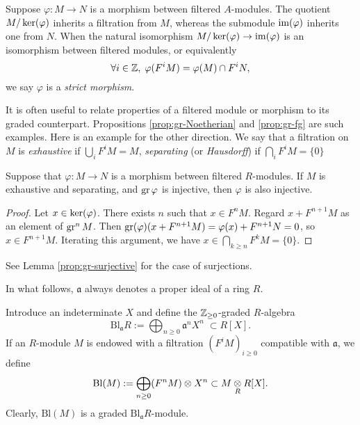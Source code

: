 \begin{remark}
	Suppose $\varphi: M \to N$ is a morphism between filtered $A$-modules. The quotient $M/\operatorname{ker}(\varphi)$ inherits a filtration from $M$, whereas the submodule $\operatorname{im}(\varphi)$ inherits one from $N$. When the natural isomorphism $M/\operatorname{ker}(\varphi) \to \operatorname{im}(\varphi)$ is an isomorphism between filtered modules, or equivalently
	\[ \forall i \in \mathbb{Z}, \; \varphi(F^i M) = \varphi(M) \cap F^i N, \]
	we say $\varphi$ is a \emph{strict morphism}.
\end{remark}

It is often useful to relate properties of a filtered module or morphism to its graded counterpart. Propositions \ref{prop:gr-Noetherian} and \ref{prop:gr-fg} are such examples. Here is an example for the other direction. We say that a filtration on $M$ is \emph{exhaustive} if $\bigcup_i F^i M = M$, \emph{separating} (or \emph{Hausdorff}) if $\bigcap_i F^i M = \{0\}$

\begin{proposition}\label{prop:gr-injective}
	Suppose that $\varphi: M \to N$ is a morphism between filtered $R$-modules. If $M$ is exhaustive and separating, and $\operatorname{gr}\varphi$ is injective, then $\varphi$ is also injective.
\end{proposition}
\begin{proof}
	Let $x \in \operatorname{ker}(\varphi)$. There exists $n$ such that $x \in F^n M$. Regard $x + F^{n+1} M$ as an element of $\operatorname{gr}^n M$. Then $\operatorname{gr}(\varphi)(x + F^{n+1} M) = \varphi(x) + F^{n+1} N = 0$, so $x \in F^{n+1} M$. Iterating this argument, we have $x \in \bigcap_{k \geq n} F^k M = \{0\}$.
\end{proof}
See Lemma \ref{prop:gr-surjective} for the case of surjections.

In what follows, $\mathfrak{a}$ always denotes a proper ideal of a ring $R$.

\begin{definition}
	Introduce an indeterminate $X$ and define the $\mathbb{Z}_{\geq 0}$-graded $R$-algebra
	\[ \text{Bl}_{\mathfrak{a}} R := \bigoplus_{n \geq 0} \mathfrak{a}^n X^n \; \subset R[X]. \]
	If an $R$-module $M$ is endowed with a filtration $(F^i M)_{i \geq 0}$ compatible with $\mathfrak{a}$, we define
	\[ \text{Bl}(M) := \bigoplus_{n \geq 0} (F^n M) \otimes X^n \subset M \underset{R}{\otimes} R[X]. \]
	Clearly, $\text{Bl}(M)$ is a graded $\text{Bl}_{\mathfrak{a}} R$-module.
\end{definition}

